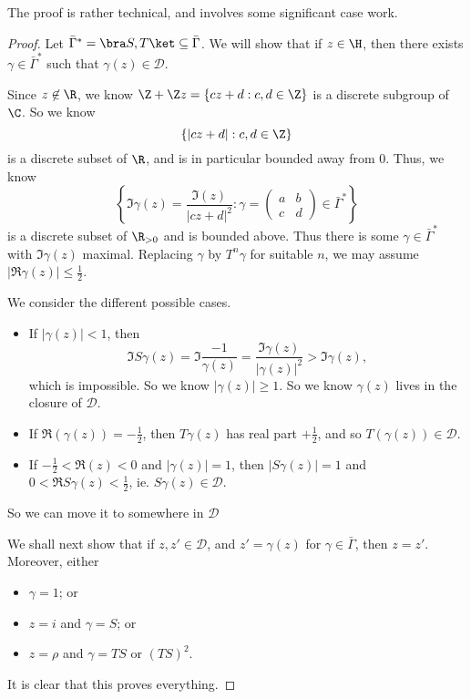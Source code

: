 \documentclass[a4paper]{article}
\begin{document}
The proof is rather technical, and involves some significant case work.
\begin{proof}
  Let $\bar{\Gamma}^* = \bra S, T\ket \subseteq \bar{\Gamma}$. We will show that if $z \in \H$, then there exists $\gamma \in \bar\Gamma^*$ such that $\gamma(z) \in \mathcal{D}$.

  Since $z \not \in \R$, we know $\Z + \Z z = \{cz + d: c, d \in \Z\}$ is a discrete subgroup of $\C$. So we know
  \[
    \{|cz + d|: c, d \in \Z\}
  \]
  is a discrete subset of $\R$, and is in particular bounded away from $0$. Thus, we know
  \[
    \left\{\Im \gamma(z) = \frac{\Im (z)}{|cz + d|^2}: \gamma =
    \begin{pmatrix}
      a & b\\
      c & d
    \end{pmatrix} \in \bar\Gamma^*\right\}
  \]
  is a discrete subset of $\R_{>0}$ and is bounded above. Thus there is some $\gamma \in \bar{\Gamma}^*$ with $\Im \gamma(z)$ maximal. Replacing $\gamma$ by $T^n \gamma$ for suitable $n$, we may assume $|\Re \gamma(z)| \leq \frac{1}{2}$.

  We consider the different possible cases.
  \begin{itemize}
    \item If $|\gamma(z)| < 1$, then
      \[
        \Im S \gamma(z) = \Im \frac{-1}{\gamma(z)} = \frac{\Im \gamma(z)}{|\gamma(z)|^2} > \Im \gamma(z),
      \]
      which is impossible. So we know $|\gamma(z)| \geq 1$. So we know $\gamma(z)$ lives in the closure of $\mathcal{D}$.

    \item If $\Re(\gamma(z)) = -\frac{1}{2}$, then $T \gamma(z)$ has real part $+\frac{1}{2}$, and so $T(\gamma(z)) \in \mathcal{D}$.

    \item If $-\frac{1}{2} < \Re(z) < 0$ and $|\gamma(z)| = 1$, then $|S\gamma(z)| = 1$ and $0 < \Re S\gamma(z) < \frac{1}{2}$, ie. $S \gamma(z) \in \mathcal{D}$.
  \end{itemize}
  So we can move it to somewhere in $\mathcal{D}$

  \separator

  We shall next show that if $z, z' \in \mathcal{D}$, and $z' = \gamma(z)$ for $\gamma \in \bar{\Gamma}$, then $z = z'$. Moreover, either
  \begin{itemize}
    \item $\gamma = 1$; or
    \item $z = i$ and $\gamma = S$; or
    \item $z = \rho$ and $\gamma = TS$ or $(TS)^2$.
  \end{itemize}
  It is clear that this proves everything.


\end{proof}
\end{document}
